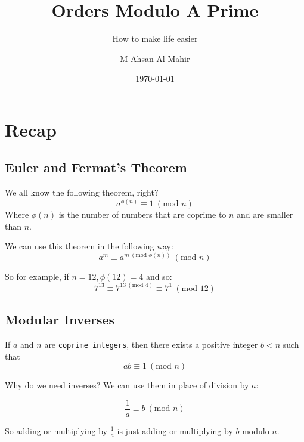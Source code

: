 \documentclass[compress]{beamer}
\title{Orders Modulo A Prime}
\subtitle{How to make life easier}
\author{M Ahsan Al Mahir}
\date{\today}
\newcommand{\gap}{\pause\vspace{1em}}
\begin{document}
\begin{frame}
    \maketitle
\end{frame}

\section{Recap}

\subsection{Euler and Fermat's Theorem}

\begin{frame}
    We all know the following theorem, right?
    \[a^{\phi(n)} \equiv 1 \ (\text{mod } n)\]
    Where $\phi(n)$ is the number of numbers that are coprime to $n$ and are
    smaller than $n$. 

    \gap

    We can use this theorem in the following way:
    \[a^m \equiv a^{m \ (\text{mod } \phi(n))} \ (\text{mod } n)\] 

\end{frame}

\begin{frame}
    So for example, if $n = 12, \phi(12) = 4$ and so:
    \[7^{13} \equiv 7^{13 \ (\text{mod } 4)} \equiv 7^1 \ (\text{mod } 12)\] 
\end{frame}

\subsection{Modular Inverses}

\begin{frame}
    If $a$ and $n$ are \texttt{coprime integers}, then there exists a positive integer
    $b<n$ such that 
    \[ab \equiv 1 \ (\text{mod } n)\]

    \gap 

    Why do we need inverses? \pause We can use them in place of division by
    $a$:

    \[\frac{1}{a} \equiv b \ (\text{mod } n)\]

    \gap

    So adding or multiplying by $\frac{1}{a}$ is just adding or multiplying by
    $b$ modulo $n$.
\end{frame}
\end{document}
